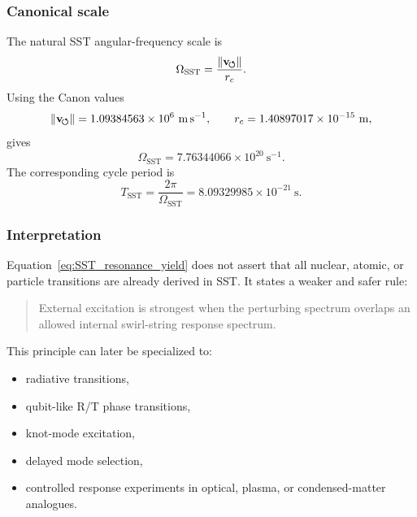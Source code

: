     \subsubsection*{Canonical scale}
        
        The natural SST angular-frequency scale is
        \begin{equation}
            \Omega_{\mathrm{SST}}
            =
            \frac{\lVert\mathbf{v}_{\!\boldsymbol{\circlearrowleft}}\rVert}{r_c}.
            \label{eq:Omega_SST_scale}
        \end{equation}
        Using the Canon values
        \[
            \vnorm = 1.09384563\times10^{6}\ \mathrm{m\,s^{-1}},
            \qquad
            \rc = 1.40897017\times10^{-15}\ \mathrm{m},
        \]
        gives
        \begin{equation}
            \Omega_{\mathrm{SST}}
            =
            7.76344066\times10^{20}\ \mathrm{s^{-1}}.
            \label{eq:Omega_SST_numeric}
        \end{equation}
        The corresponding cycle period is
        \begin{equation}
            T_{\mathrm{SST}}
            =
            \frac{2\pi}{\Omega_{\mathrm{SST}}}
            =
            8.09329985\times10^{-21}\ \mathrm{s}.
            \label{eq:T_SST_numeric}
        \end{equation}
    
    \subsubsection*{Interpretation}
        
        Equation~\eqref{eq:SST_resonance_yield} does not assert that all nuclear, atomic, or particle transitions are already derived in SST. It states a weaker and safer rule:
        
        \begin{quote}
            External excitation is strongest when the perturbing spectrum overlaps an allowed internal swirl-string response spectrum.
        \end{quote}
        
        This principle can later be specialized to:
        \begin{itemize}
            \item radiative transitions,
            \item qubit-like R/T phase transitions,
            \item knot-mode excitation,
            \item delayed mode selection,
            \item controlled response experiments in optical, plasma, or condensed-matter analogues.
        \end{itemize}
    
